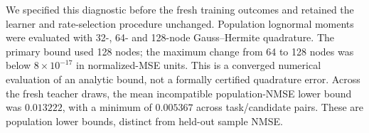 We specified this diagnostic before the fresh training outcomes and retained the learner and rate-selection procedure unchanged. Population lognormal moments were evaluated with 32-, 64- and 128-node Gauss--Hermite quadrature. The primary bound used 128 nodes; the maximum change from 64 to 128 nodes was below $8\times10^{-17}$ in normalized-MSE units. This is a converged numerical evaluation of an analytic bound, not a formally certified quadrature error. Across the fresh teacher draws, the mean incompatible population-NMSE lower bound was $0.013222$, with a minimum of $0.005367$ across task/candidate pairs. These are population lower bounds, distinct from held-out sample NMSE.
